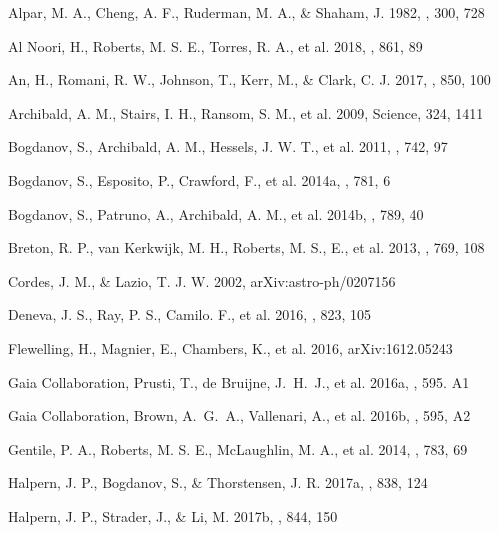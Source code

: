 \documentclass[iop]{emulateapj}
\begin{document}
\begin{thebibliography}

Alpar, M. A., Cheng, A. F., Ruderman, M. A., \& Shaham, J. 1982, \nat, 300, 728

Al Noori, H., Roberts, M. S. E., Torres, R. A., et al. 2018, \apj, 861, 89

An, H., Romani, R. W., Johnson, T., Kerr, M., \& Clark, C. J. 2017, \apj, 850, 100

Archibald, A. M., Stairs, I. H., Ransom, S. M., et al. 2009,
Science, 324, 1411

Bogdanov, S., Archibald, A. M., Hessels, J. W. T., et al. 2011, \apj, 742, 97

Bogdanov, S., Esposito, P., Crawford, F., et al. 2014a, \apj, 781, 6

Bogdanov, S., Patruno, A., Archibald, A. M., et al. 2014b, \apj, 789, 40

Breton, R. P., van Kerkwijk, M. H., Roberts, M. S., E., et al. 2013, \apj, 769, 108

Cordes, J. M., \& Lazio, T. J. W. 2002, arXiv:astro-ph/0207156

Deneva, J. S., Ray, P. S., Camilo. F., et al. 2016, \apj, 823, 105

Flewelling, H., Magnier, E., Chambers, K., et al. 2016, arXiv:1612.05243

Gaia Collaboration, Prusti, T., de Bruijne, J.~H.~J., et al. 2016a,
\aap, 595. A1

Gaia Collaboration, Brown, A.~G.~A., Vallenari, A., et al. 2016b, \aap, 595, A2

Gentile, P. A., Roberts, M. S. E., McLaughlin, M. A., et al. 2014, \apj, 783, 69

 Halpern, J. P., Bogdanov, S., \& Thorstensen, J. R. 2017a, \apj, 838, 124

 Halpern, J. P., Strader, J., \& Li, M. 2017b, \apj, 844, 150


\end{thebibliography}
\end{document}
